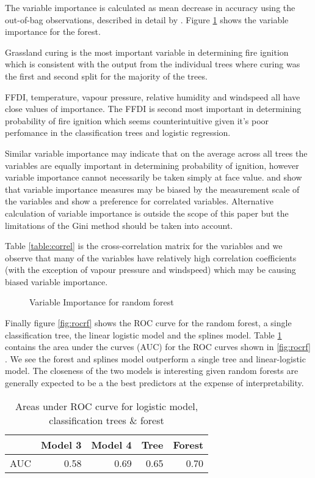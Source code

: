 \documentclass{article}
\begin{document}
The variable importance is calculated as mean decrease in accuracy using the out-of-bag observations, described in detail by \cite{archer08}. Figure \ref{fig:vimp} shows the variable importance for the forest. 

Grassland curing is the most important variable in determining fire ignition which is consistent with the output from the individual trees where curing was the first and second split for the majority of the trees. 

FFDI, temperature, vapour pressure, relative humidity and windspeed all have close values of importance. The FFDI is second most important in determining probability of fire ignition which seems counterintuitive given it's poor perfomance in the classification trees and logistic regression. 

Similar variable importance may indicate that on the average across all trees the variables are equally important in determining probability of ignition, however variable importance cannot necessarily be taken simply at face value. \cite{strob07}  and \cite{strob08} show that variable importance measures may be biased by the measurement scale of the variables and show a preference for correlated variables. Alternative calculation of variable importance is outside the scope of this paper but the limitations of the Gini method should be taken into account. 

Table \ref{table:correl} is the cross-correlation matrix for the variables and we observe that many of the variables have relatively high correlation coefficients (with the exception of vapour pressure and windspeed) which may be causing biased variable importance. 


\begin{figure}[h]
	\centering 
	\caption{Variable Importance for random forest} 
	\label{fig:vimp} 
\end{figure}

Finally figure \ref{fig:rocrf} shows the ROC curve for the random forest, a single classification tree, the linear logistic model and the splines model. Table \ref{table:AUC} contains the area under the curves (AUC) for the ROC curves shown in \ref{fig:rocrf} . We see the forest and splines model outperform a single tree and linear-logistic model. The closeness of the two models is interesting given random forests are generally expected to be a the best predictors at the expense of interpretability. 

\begin{table}[h]
	\centering
	\begin{tabular}{r|rrrr}
		\hline
		& Model 3 & Model 4 & Tree & Forest \\ 
		\hline
		AUC & 0.58 & 0.69 & 0.65 & 0.70 \\ 
		\hline
	\end{tabular}
	\caption{Areas under ROC curve for logistic model, classification trees \& forest}
	\label{table:AUC}
\end{table}
\end{document}
